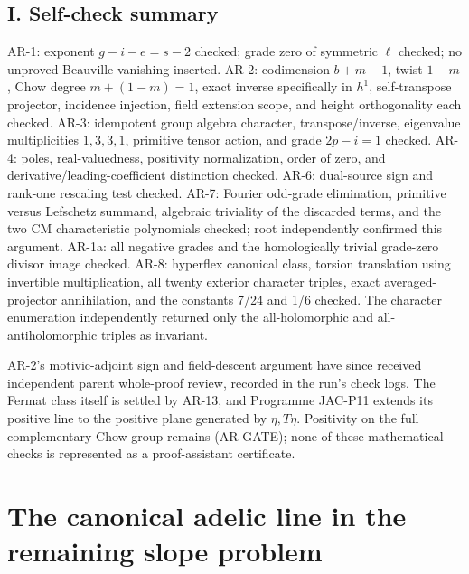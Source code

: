 \documentclass[11pt,a4paper]{article}
\begin{document}
\subsection{I. Self-check summary}\label{i.-self-check-summary}

AR-1: exponent \(g-i-e=s-2\) checked; grade zero of symmetric \(\ell\)
checked; no unproved Beauville vanishing inserted. AR-2: codimension
\(b+m-1\), twist \(1-m\), Chow degree \(m+(1-m)=1\), exact inverse
specifically in \(h^1\), self-transpose projector, incidence injection,
field extension scope, and height orthogonality each checked. AR-3:
idempotent group algebra character, transpose/inverse, eigenvalue
multiplicities \(1,3,3,1\), primitive tensor action, and grade
\(2p-i=1\) checked. AR-4: poles, real-valuedness, positivity
normalization, order of zero, and derivative/leading-coefficient
distinction checked. AR-6: dual-source sign and rank-one rescaling test
checked. AR-7: Fourier odd-grade elimination, primitive versus Lefschetz
summand, algebraic triviality of the discarded terms, and the two CM
characteristic polynomials checked; root independently confirmed this
argument. AR-1a: all negative grades and the homologically trivial
grade-zero divisor image checked. AR-8: hyperflex canonical class,
torsion translation using invertible multiplication, all twenty exterior
character triples, exact averaged-projector annihilation, and the
constants 7/24 and 1/6 checked. The character enumeration independently
returned only the all-holomorphic and all-antiholomorphic triples as
invariant.

AR-2's motivic-adjoint sign and field-descent argument have since
received independent parent whole-proof review, recorded in the run's
check logs. The Fermat class itself is settled by AR-13, and Programme
JAC-P11 extends its positive line to the positive plane generated by
\(\eta,T\eta\). Positivity on the full complementary Chow group remains
(AR-GATE); none of these mathematical checks is represented as a
proof-assistant certificate.
\section{The canonical adelic line in the remaining slope problem}
\label{sec:AR10}
\end{document}
